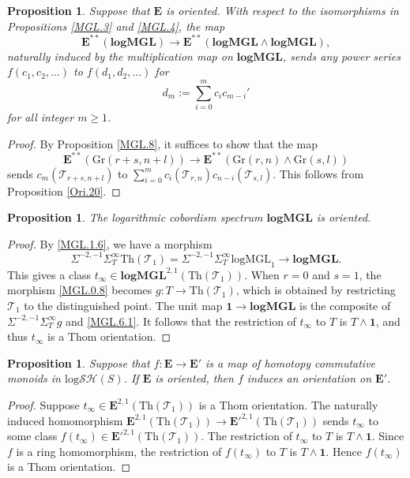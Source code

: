\documentclass[11pt, a4paper]{amsart}
\newtheorem{prop}[thm]{Proposition}
\theoremstyle{definition}
\numberwithin{equation}{subsection}
\newcommand{\Gr}{{\mathrm{Gr}}}
\newcommand{\Thom}{\mathrm{Th}}
\newcommand{\logMGL}{{\mathrm{logMGL}}}
\newcommand{\spectlogMGL}{{\mathbf{logMGL}}}
\newcommand{\cT}{\mathcal{T}}
\newcommand{\unit}{\mathbf{1}}
\newcommand{\ringE}{\mathbf{E}}
\newcommand{\inflogSH}{\mathrm{log}\mathcal{SH}}
\begin{document}
\begin{prop}
\label{MGL.9}
Suppose that $\ringE$ is oriented.
With respect to the isomorphisms in {\rm Propositions \ref{MGL.3} and \ref{MGL.4}}, 
the map
\[
\ringE^{**}(\spectlogMGL)
\to
\ringE^{**}(\spectlogMGL\wedge \spectlogMGL), 
\]
naturally induced by the multiplication map on $\spectlogMGL$,  
sends any power series $f(c_1,c_2,\ldots)$ to $f(d_1,d_2,\ldots)$ for
\[
d_m:=\sum_{i=0}^m c_i c_{m-i}'
\]
for all integer $m\geq 1$.
\end{prop}
\begin{proof}
By Proposition \ref{MGL.8}, it suffices to show that the map
\[
\ringE^{**}(\Gr(r+s,n+l))
\to
\ringE^{**}(\Gr(r,n)\wedge \Gr(s,l))
\]
sends $c_m(\cT_{r+s,n+l})$ to $\sum_{i=0}^m c_i(\cT_{r,n})c_{n-i}(\cT_{s,l})$.
This follows from Proposition \ref{Ori.20}.
\end{proof}

\begin{prop}
\label{MGL.6}
The logarithmic cobordism spectrum $\spectlogMGL$ is oriented.
\end{prop}
\begin{proof}
By \eqref{MGL.1.6}, we have a morphism
\begin{equation}
\label{MGL.6.1}
\Sigma^{-2,-1}\Sigma_T^\infty \Thom(\cT_1)=\Sigma^{-2,-1}\Sigma_T^\infty \logMGL_1\to \spectlogMGL.
\end{equation}
This gives a class $t_\infty \in \spectlogMGL^{2,1}(\Thom(\cT_1))$.
When $r=0$ and $s=1$, 
the morphism \eqref{MGL.0.8} becomes $g\colon T\to \Thom(\cT_1)$, 
which is obtained by restricting $\cT_1$ to the distinguished point.
The unit map $\unit\to \spectlogMGL$ is the composite of $\Sigma^{-2,-1}\Sigma_T^\infty g$ and \eqref{MGL.6.1}.
It follows that the restriction of $t_\infty$ to $T$ is $T\wedge \unit$, and thus $t_\infty$ is a Thom orientation.
\end{proof}


\begin{prop}
\label{MGL.7}
Suppose that $f\colon \ringE\to \ringE'$ is a map of homotopy commutative monoids in $\inflogSH(S)$.
If $\ringE$ is oriented, then $f$ induces an orientation on $\ringE'$.
\end{prop}
\begin{proof}
Suppose $t_\infty\in \ringE^{2,1}(\Thom(\cT_1))$ is a Thom orientation.
The naturally induced homomorphism $\ringE^{2,1}(\Thom(\cT_1))\to \ringE'^{2,1}(\Thom(\cT_1))$ 
sends $t_\infty$ to some class $f(t_\infty)\in \ringE'^{2,1}(\Thom(\cT_1))$.
The restriction of $t_\infty$ to $T$ is $T\wedge \unit$.
Since $f$ is a ring homomorphism, the restriction of $f(t_\infty)$ to $T$ is $T\wedge \unit$.
Hence $f(t_\infty)$ is a Thom orientation.
\end{proof}
\end{document}
